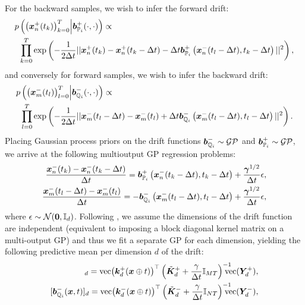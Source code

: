 \documentclass[a4paper,12pt,twoside,openright]{report}
\theoremstyle{definition}
\begin{document}
For the backward samples, we wish to infer the forward drift:
\begin{align*}
    p&\left( \big({\bm{x}}^{+}_n(t_k)\big)_{k=0}^T  \Big| {\bm{b}}^{+}_{{\mathbb{P}}_{i}}(\cdot, \cdot)\right) \propto\\
    &\prod_{k=0}^T \exp \left( -\frac{1}{2\Delta t} ||{\bm{x}}^{+}_n(t_k) - {\bm{x}}^{+}_n(t_k - \Delta t) -  \Delta t{\bm{b}}^{+}_{{\mathbb{P}}_{i}}\left({\bm{x}}^{-}_n(t_l - \Delta t), t_k - \Delta t\right) ||^2 \right), 
\end{align*}
and conversely for forward samples, we wish to infer the backward drift:
\begin{align*}
    p&\left(\big({\bm{x}}^{-}_m(t_l)\big)_{l=0}^T \Big| {\bm{b}}^{-}_{{\mathbb{Q}}_{i}}(\cdot, \cdot)\right) \propto\\
    &\prod_{l=0}^T \exp \left( -\frac{1}{2\Delta t} ||{\bm{x}}^{-}_m(t_l - \Delta t)  - {\bm{x}}^{-}_m(t_l)  +  \Delta t{\bm{b}}^{-}_{{\mathbb{Q}}_{i}}\left({\bm{x}}^{-}_m(t_l - \Delta t), t_l - \Delta t\right) ||^2 \right).
\end{align*}
Placing Gaussian process priors on the drift functions ${\bm{b}}^{-}_{{\mathbb{Q}}_{i}} \sim \mathcal{GP} $ and ${\bm{b}}^{+}_{{\mathbb{P}}_{i}} \sim \mathcal{GP} $, we arrive at the following multioutput GP regression problems:
\begin{align*}
        \frac{{\bm{x}}^{-}_n(t_k) - {\bm{x}}^{-}_n(t_k - \Delta t)}{\Delta t} = {\bm{b}}^{+}_{{\mathbb{P}}_{i}}\left({\bm{x}}^{-}_n(t_k - \Delta t), t_k - \Delta t\right) +\frac{\bm{\gamma}^{1/2}}{\Delta t}\epsilon ,\\
        \frac{{\bm{x}}^{-}_m(t_l - \Delta t)  - {\bm{x}}^{-}_m(t_l)}{\Delta t}  = -{\bm{b}}^{-}_{{\mathbb{Q}}_{i}}\left({\bm{x}}^{-}_m(t_l - \Delta t), t_l - \Delta t\right) +\frac{\bm{\gamma}^{1/2}}{\Delta t}\epsilon,
\end{align*}
where $\epsilon \sim {\mathcal{N}}({\bm{0}}, {\mathbb{I}_d})$. Following \citep{ruttor2013approximate, batz2018approximate}, we assume the dimensions of the drift function are independent (equivalent to imposing a block diagonal kernel matrix on a multi-output GP) and thus we fit a separate GP for each dimension, yielding the following predictive mean per dimension $d$ of the drift:
\begin{align}
[\bar{\vb}^{+}_{\P_{i}}(\vx, t)]_d = \vec\big(\vk_d^{+}(\vx \oplus t)\big)^{\top} \left(\tilde{\mK}_d^{+} + \frac{\gamma}{\Delta t} \mathbb{I}_{MT}\right)^{-1}\!\!\!\!\!\!\vec(\mY_d^{+}), \\
[\vb^{-}_{\Q_{i}}(\vx, t)]_d = \vec\big(\vk_d^{-}(\vx \oplus t)\big)^{\top} \left(\tilde{\mK}_d^{-} + \frac{\gamma}{\Delta t} \mathbb{I}_{NT}\right)^{-1}\!\!\!\!\!\!\vec(\mY_d^{-}) ,
\end{align}
\end{document}
